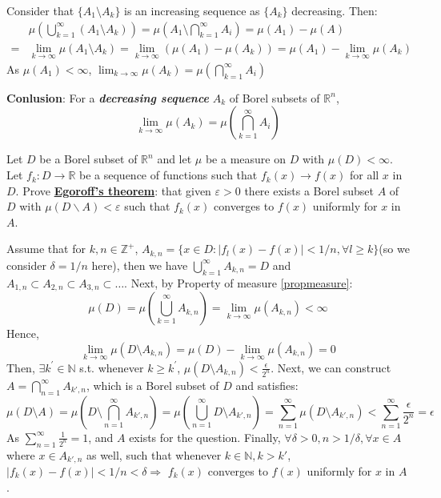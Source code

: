 \documentclass[12pt, a4paper]{article}
\begin{document}
\begin{customsol}{1.18}
    Consider that $\{A_1\setminus A_k\}$ is an increasing sequence as $\{A_k\}$ decreasing. Then:
    $$ 
    \begin{aligned}
        &\mu\left(\bigcup_{k=1}^{\infty}\left(A_{1}\setminus A_{k}\right)\right) = \mu\left(A_{1} \setminus \bigcap_{k=1}^{\infty} A_{i}\right) = \mu(A_1) - \mu (A) \\
        =&\lim _{k \rightarrow \infty} \mu\left(A_{1} \setminus A_{k}\right) = \lim_{k\rightarrow\infty} (\mu(A_1)-\mu (A_k)) = \mu(A_1) - \lim_{k\rightarrow\infty} \mu(A_k)
    \end{aligned}$$
    As $\mu(A_1)<\infty$, $\displaystyle \lim_{k\rightarrow \infty} \mu(A_k) = \mu(\bigcap_{k=1}^{\infty} A_{i})$
\end{customsol}

\textbf{Conlusion}: For a \textbf{\textit{decreasing sequence}} $A_k$ of Borel subsets of $\mathbb{R}^n$, 
$$\displaystyle \lim_{k\rightarrow \infty} \mu(A_k) = \mu(\bigcap_{k=1}^{\infty} A_{i})$$


\begin{customexercise}{1.23}
    Let $D$ be a Borel subset of $\mathbb{R}^{n}$ and let $\mu$ be a measure 
    on $D$ with $\mu(D)<\infty$. Let $f_{k}: D \rightarrow \mathbb{R}$ be a 
    sequence of functions such that $f_{k}(x) \rightarrow f(x)$ for all $x$ 
    in $D$. Prove \underline{\textbf{Egoroff's theorem}}: that given $\varepsilon>0$ there exists 
    a Borel subset $A$ of $D$ with $\mu(D \backslash A)<\varepsilon$ such that 
    $f_{k}(x)$ converges to $f(x)$ uniformly for $x$ in $A$.
\end{customexercise}

\begin{customsol}{1.23} 
    Assume that for $k, n \in \mathbb{Z}^+$, $A_{k, n} = \{x\in D: |f_l(x) - f(x)| < 1/n, \forall l\geq k\}$(so we consider $\delta = 1/n$ here), 
    then we have $\displaystyle \bigcup_{k=1}^\infty A_{k, n} = D$ and 
    $A_{1, n}\subset A_{2, n}\subset A_{3, n}\subset\dots$. Next, by Property of measure \ref{propmeasure}:
    $$\displaystyle \mu(D) = \mu(\bigcup_{k=1}^\infty A_{k,n}) = \lim_{k\rightarrow\infty}\mu(A_{k,n})<\infty$$
    Hence, 
    $$\displaystyle \lim_{k\rightarrow\infty}\mu(D\setminus A_{k,n}) = \mu(D) - \lim_{k\rightarrow\infty} \mu(A_{k, n}) = 0$$
    Then, $\exists k^\prime \in \mathbb{N}$  s.t. whenever 
    $k\geq k^\prime$, $\mu(D\setminus A_{k,n}) < \displaystyle \frac{\epsilon}{2^n}$. 
    Next, we can construct $\displaystyle A = \bigcap_{n = 1}^\infty A_{k',n}$, which is a Borel subset of $D$ and satisfies:
    $$\mu(D\setminus A) = \mu(D\setminus \bigcap_{n=1}^\infty A_{k', n}) = \mu(\bigcup_{n=1}^\infty D\setminus A_{k',n}) = \sum_{n=1}^\infty \mu(D\setminus A_{k',n}) < \sum_{n=1}^\infty \frac{\epsilon}{2^n} = \epsilon$$
    As $\displaystyle \sum_{n=1}^{\infty} \frac{1}{2^n} = 1$, and $A$ exists for the question. 
    Finally, $\forall\delta > 0, n > 1/\delta, \forall x\in A$ where $x\in A_{k', n}$ as well, such that whenever $k\in\mathbb{N}, k>k'$, $|f_k(x) - f(x)| < 1/n < \delta\Rightarrow$ $f_k(x)$ converges to $f(x)$ uniformly for $x$ in $A$.
    
    \end{customsol}
\end{document}
